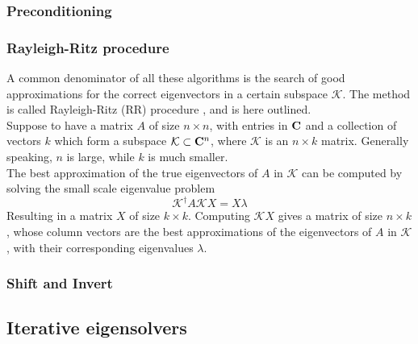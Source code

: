 \subsubsection{Preconditioning}
\subsubsection{Rayleigh-Ritz procedure}
A common denominator of all these algorithms is the search of good approximations for the correct eigenvectors in a certain subspace $\mathcal K$. The method is called Rayleigh-Ritz (RR) procedure \cite{Saad1992}, and is here outlined.
\\Suppose to have a matrix $A$ of size $n\times n$, with entries in $\mathbf{C}$ and a collection of vectors $k$ which form a subspace $\mathcal K \subset \mathbf{C}^n$, where $\mathcal K$ is an $n\times k$ matrix. Generally speaking, $n$ is large, while $k$ is much smaller.
\\The best approximation of the true eigenvectors of $A$ in $\mathcal K$ can be computed by solving the small scale eigenvalue problem
\begin{equation}
    \mathcal K^\dagger A  \mathcal K X = X\lambda
\end{equation}
Resulting in a matrix $X$ of size $k\times k$.
Computing $\mathcal K X$ gives a matrix of size $n\times k$, whose column vectors are the best approximations of the eigenvectors of $A$ in $\mathcal K$, with their corresponding eigenvalues $\lambda$.
\subsubsection{Shift and Invert}
\subsection{Iterative eigensolvers}
